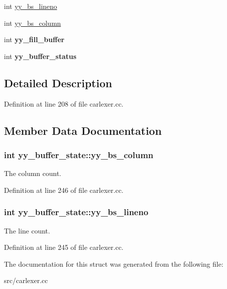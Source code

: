 \begin{DoxyCompactItemize}
\item 
int \hyperlink{structyy__buffer__state_a818e94bc9c766e683c60df1e9fd01199}{yy\-\_\-bs\-\_\-lineno}
\item 
int \hyperlink{structyy__buffer__state_a10c4fcd8be759e6bf11e6d3e8cdb0307}{yy\-\_\-bs\-\_\-column}
\item 
\hypertarget{structyy__buffer__state_a63d2afbb1d79a3fc63df9e12626f827d}{int {\bfseries yy\-\_\-fill\-\_\-buffer}}\label{structyy__buffer__state_a63d2afbb1d79a3fc63df9e12626f827d}

\item 
\hypertarget{structyy__buffer__state_a70fd925d37a2f0454fbd0def675d106c}{int {\bfseries yy\-\_\-buffer\-\_\-status}}\label{structyy__buffer__state_a70fd925d37a2f0454fbd0def675d106c}

\end{DoxyCompactItemize}


\subsection{Detailed Description}


Definition at line 208 of file carlexer.\-cc.



\subsection{Member Data Documentation}
\hypertarget{structyy__buffer__state_a10c4fcd8be759e6bf11e6d3e8cdb0307}{
\subsubsection[{yy\-\_\-bs\-\_\-column}]{\setlength{\rightskip}{0pt plus 5cm}int yy\-\_\-buffer\-\_\-state\-::yy\-\_\-bs\-\_\-column}}\label{structyy__buffer__state_a10c4fcd8be759e6bf11e6d3e8cdb0307}
The column count. 

Definition at line 246 of file carlexer.\-cc.

\hypertarget{structyy__buffer__state_a818e94bc9c766e683c60df1e9fd01199}{
\subsubsection[{yy\-\_\-bs\-\_\-lineno}]{\setlength{\rightskip}{0pt plus 5cm}int yy\-\_\-buffer\-\_\-state\-::yy\-\_\-bs\-\_\-lineno}}\label{structyy__buffer__state_a818e94bc9c766e683c60df1e9fd01199}
The line count. 

Definition at line 245 of file carlexer.\-cc.



The documentation for this struct was generated from the following file\-:\begin{DoxyCompactItemize}
\item 
src/carlexer.\-cc\end{DoxyCompactItemize}
